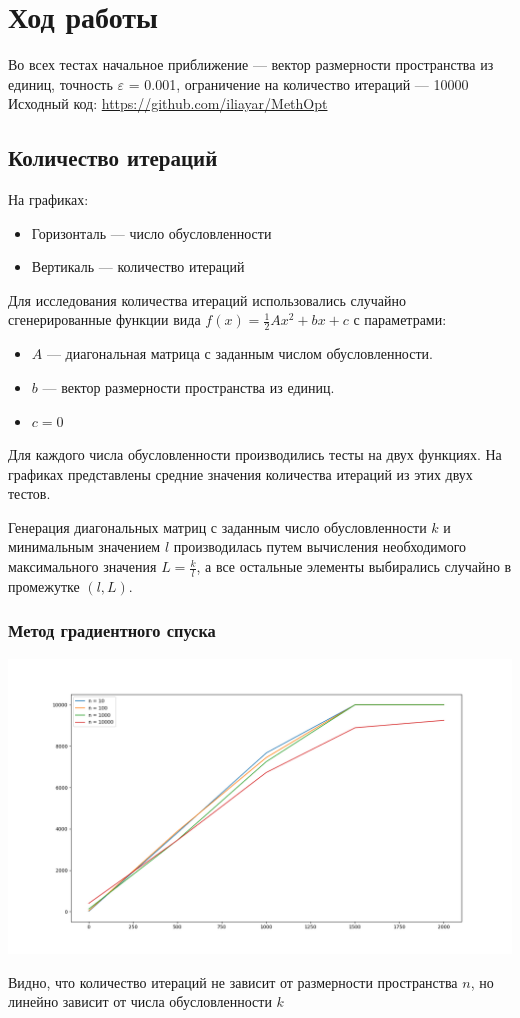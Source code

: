 \documentclass[english]{article}
\begin{document}
\section{Ход работы}

Во всех тестах начальное приближение --- вектор размерности
пространства из единиц, точность \(\varepsilon\) = 0.001, ограничение на
количество итераций --- 10000 \\
Исходный код: \href{https://github.com/iliayar/MethOpt}{https://github.com/iliayar/MethOpt}
\subsection{Количество итераций}
На графиках:
\begin{itemize}
    \item Горизонталь --- число обусловленности
    \item Вертикаль --- количество итераций
\end{itemize}
Для исследования количества итераций использовались случайно
сгенерированные функции вида \(f(x) = \frac{1}{2} A x^2 + b x + c\) с
параметрами:
\begin{itemize}
    \item \(A\) --- диагональная матрица с заданным числом обусловленности.
    \item \(b\) --- вектор размерности пространства из единиц.
    \item \(c = 0\)
\end{itemize}
Для каждого числа обусловленности производились тесты на двух
функциях. На графиках представлены средние значения количества
итераций из этих двух тестов.

Генерация диагональных матриц с заданным число обусловленности \(k\) и
минимальным значением \(l\) производилась путем вычисления
необходимого максимального значения \(L = \frac{k}{l}\), а все
остальные элементы выбирались случайно в промежутке \((l, L)\).
\subsubsection{Метод градиентного спуска}
\begin{center}
    \includegraphics[scale=0.4]{plots/gradient_descent_1.png}
\end{center} 
Видно, что количество итераций не
зависит от размерности пространства \(n\), но линейно зависит от числа
обусловленности \(k\)
\end{document}
